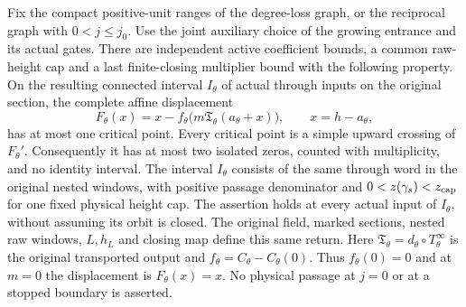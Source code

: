 \begin{proposition}
\label{p2:prop-physical-degree-count}
Fix the compact positive-unit ranges of the degree-loss graph, or
the reciprocal graph with $0<j\le j_0$. Use the joint auxiliary
choice of the growing entrance and its actual gates. There are
independent active coefficient bounds, a common raw-height cap and
a last finite-closing multiplier bound with the following property.
On the resulting connected interval $I_\theta$ of actual through
inputs on the original section, the complete affine displacement
\[
 F_\theta(x)=x-f_\theta\bigl(m\mathfrak T_\theta(a_\theta+x)\bigr),
 \qquad x=h-a_\theta,
 \tag{PC1}
\]
has at most one critical point. Every critical point is a simple
upward crossing of $F_\theta'$. Consequently it has at most two
isolated zeros, counted with multiplicity, and no identity interval.
The interval $I_\theta$ consists of the same through word in the
original nested windows, with positive passage denominator and
$0<z(\gamma_s)<z_{\rm cap}$ for one fixed physical height cap.
The assertion holds at every actual input of $I_\theta$, without
assuming its orbit is closed. The original field, marked sections,
nested raw windows, $L,h_L$ and closing map define this same return.
Here $\mathfrak T_\theta=d_\theta\circ T_\theta^\infty$ is the
original transported output and $f_\theta=C_\theta-C_\theta(0)$.
Thus $f_\theta(0)=0$ and at $m=0$ the displacement is $F_\theta(x)=x$.
No physical passage at $j=0$ or at a stopped boundary is asserted.
\end{proposition}

